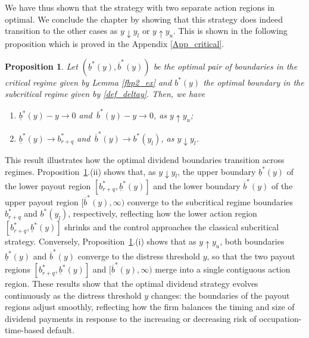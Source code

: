 \documentclass[11pt]{article} %
\newtheorem{proposition}[theorem]{Proposition}
\newcommand{\ubar}[1]{\underaccent{\bar}{#1}}
\numberwithin{komcounter}{section}
\renewcommand{\ubar}{\underline}
\renewcommand{\bar}{\overline}
\numberwithin{equation}{section}
\numberwithin{theorem}{section}
\begin{document}
We have thus shown that the strategy with two separate action regions in optimal. We conclude the chapter by showing that this strategy does indeed transition to the other cases as $y\downarrow y_l$ or $y\uparrow y_u$. This is shown in the following proposition which is proved in the Appendix \ref{App_critical}.

\begin{proposition} \label{prop_transition}
Let $(\ubar{b}^*(y),\bar{b}^*(y))$ be the optimal pair of boundaries in the critical regime given by Lemma \ref{fbp2_ex} and $b^*(y)$ the optimal boundary in the subcritical regime given by \eqref{def_deltay}. 
Then, we have 
\begin{enumerate}[\rm (i)]
\item $\underline{b}^*(y) - y \to 0 $ and $\, \overline{b}^*(y) -y \to 0$, as $y \uparrow y_u$;
\item $\underline{b}^*(y) \to b^*_{r+q}$ and $\, \overline{b}^*(y) \to b^*(y_l)$, as $y \downarrow y_l$.
\end{enumerate}
\end{proposition}

This result illustrates how the optimal dividend boundaries transition across regimes. 
Proposition~\ref{prop_transition}.(ii) shows that, as $y \downarrow y_l$, the upper boundary $\underline{b}^*(y)$ of the lower payout region $[b^*_{r+q}, \underline{b}^*(y)]$ and the lower boundary $\overline{b}^*(y)$ of the upper payout region $[\overline{b}^*(y), \infty)$ converge to the subcritical regime boundaries $b^*_{r+q}$ and $b^*(y_l)$, respectively, reflecting how the lower action region $[b^*_{r+q}, \underline{b}^*(y)]$ shrinks and the control approaches the classical subcritical strategy. Conversely, Proposition~\ref{prop_transition}.(i) shows that as $y \uparrow y_u$, both boundaries $\underline{b}^*(y)$ and $\overline{b}^*(y)$ converge to the distress threshold $y$, so that the two payout regions $[b^*_{r+q}, \underline{b}^*(y)]$ and $[\overline{b}^*(y), \infty)$ merge into a single contiguous action region. 
These results show that the optimal dividend strategy evolves continuously as the distress threshold $y$ changes: the boundaries of the payout regions adjust smoothly, reflecting how the firm balances the timing and size of dividend payments in response to the increasing or decreasing risk of occupation-time-based default.
\end{document}
